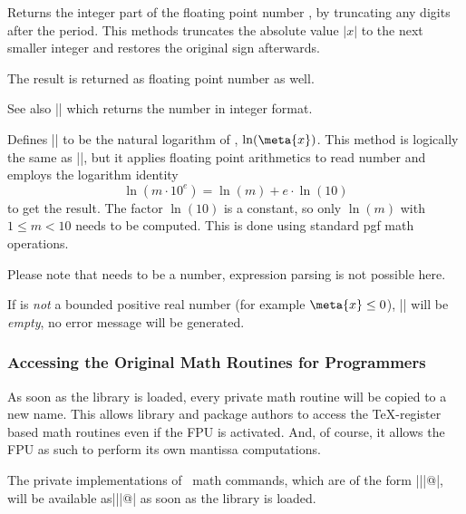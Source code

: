\begin{command}{\pgfmathfloatint{}}
  Returns the integer part of the floating point number , by
  truncating any digits after the period. This methods truncates the
  absolute value $\rvert x \lvert$ to the next smaller integer and
  restores the original sign afterwards. 

  The result is returned as floating point number as well.

  See also |\pgfmathfloattoint| which returns the number in integer
  format. 
\end{command}

\begin{command}{}
  Defines |\pgfmathresult| to be the natural logarithm of ,
  $\ln(\meta{x})$. This method is logically the same as |\pgfmathln|,
  but it applies floating point arithmetics to read number 
  and employs the logarithm identity
  \[ \ln(m \cdot 10^e) = \ln(m) + e \cdot \ln(10) \]
  to get the result. The factor $\ln(10)$ is a constant, so only
  $\ln(m)$ with $1 \le m < 10$ needs to be computed. This is done
  using standard pgf math operations. 

  Please note that  needs to be a number, expression parsing
  is not possible here. 

  If  is \emph{not} a bounded positive real number (for
  example $\meta{x} \le 0$), |\pgfmathresult| will be \emph{empty}, no
  error message will be generated. 
\begin{codeexample}[]
\pgfmathresult
\end{codeexample}
\begin{codeexample}[]
\pgfmathresult
\end{codeexample}
\end{command}

\subsubsection{Accessing the Original Math Routines for Programmers}

As soon as the library is loaded, every private math routine will be
copied to a new name. This allows library and package authors to
access the \TeX-register based math routines even if the FPU is
activated. And, of course, it allows the FPU as such to perform its
own mantissa computations.

The private implementations of \pgfname\ math commands, which are of
the form |\pgfmath||@|, will be available
as|\pgfmath@basic@||@| as soon as the library is loaded. 


\endgroup
